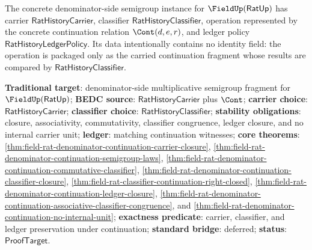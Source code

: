 \begin{definition}
\label{def:field-rat-denominator-continuation-semigroup-instance}
The concrete denominator-side semigroup instance for
$\FieldUp(\mathsf{RatUp})$ has carrier
$\mathsf{RatHistoryCarrier}$, classifier
$\mathsf{RatHistoryClassifier}$, operation represented by the concrete
continuation relation $\Cont(d,e,r)$, and ledger policy
$\mathsf{RatHistoryLedgerPolicy}$. Its data intentionally contains no identity
field: the operation is packaged only as the carried continuation fragment whose
results are compared by $\mathsf{RatHistoryClassifier}$.
\end{definition}

\textbf{Traditional target}: denominator-side multiplicative semigroup fragment
for $\FieldUp(\mathsf{RatUp})$; \textbf{BEDC source}:
$\mathsf{RatHistoryCarrier}$ plus $\Cont$; \textbf{carrier choice}:
$\mathsf{RatHistoryCarrier}$; \textbf{classifier choice}:
$\mathsf{RatHistoryClassifier}$; \textbf{stability obligations}: closure,
associativity, commutativity, classifier congruence, ledger closure, and no
internal carrier unit; \textbf{ledger}: matching continuation witnesses;
\textbf{core theorems}:
\autoref{thm:field-rat-denominator-continuation-carrier-closure},
\autoref{thm:field-rat-denominator-continuation-semigroup-laws},
\autoref{thm:field-rat-denominator-continuation-commutative-classifier},
\autoref{thm:field-rat-denominator-continuation-classifier-closure},
\autoref{thm:field-rat-classifier-continuation-right-closed},
\autoref{thm:field-rat-denominator-continuation-ledger-closure},
\autoref{thm:field-rat-denominator-continuation-associative-classifier-congruence},
and \autoref{thm:field-rat-denominator-continuation-no-internal-unit};
\textbf{exactness predicate}: carrier, classifier, and ledger preservation under
continuation; \textbf{standard bridge}: deferred; \textbf{status}:
$\mathsf{ProofTarget}$.

